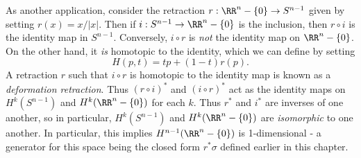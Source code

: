 As another application, consider the retraction $r: \RR^n - \{ 0 \} \to S^{n-1}$ given by setting $r(x) = x/|x|$. Then if $i: S^{n-1} \to \RR^n - \{ 0 \}$ is the inclusion, then $r \circ i$ is the identity map in $S^{n-1}$. Conversely, $i \circ r$ is \emph{not} the identity map on $\RR^n - \{ 0 \}$. On the other hand, it \emph{is} homotopic to the identity, which we can define by setting
%
\[ H(p,t) = tp + (1 - t) r(p). \]
%
A retraction $r$ such that $i \circ r$ is homotopic to the identity map is known as a \emph{deformation retraction}. Thus $(r \circ i)^*$ and $(i \circ r)^*$ act as the identity maps on $H^k(S^{n-1})$ and $H^k(\RR^n - \{ 0 \})$ for each $k$. Thus $r^*$ and $i^*$ are inverses of one another, so in particular, $H^k(S^{n-1})$ and $H^k(\RR^n - \{ 0 \})$ are \emph{isomorphic} to one another. In particular, this implies $H^{n-1}(\RR^n - \{ 0 \})$ is 1-dimensional - a generator for this space being the closed form $r^*\sigma$ defined earlier in this chapter.

